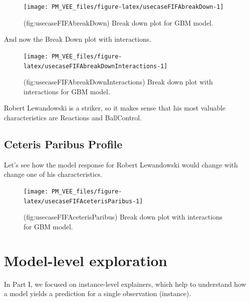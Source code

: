 \documentclass[12pt,]{krantz}
\begin{document}
\begin{figure}

{\centering \texttt{[image: PM\_VEE\_files/figure-latex/usecaseFIFAbreakDown-1]} 

}

\caption{(fig:usecaseFIFAbreakDown) Break down plot for GBM model.}\label{fig:usecaseFIFAbreakDown}
\end{figure}

And now the Break Down plot with interactions.

\begin{figure}

{\centering \texttt{[image: PM\_VEE\_files/figure-latex/usecaseFIFAbreakDownInteractions-1]} 

}

\caption{(fig:usecaseFIFAbreakDownInteractions) Break down plot with interactions for GBM model.}\label{fig:usecaseFIFAbreakDownInteractions}
\end{figure}

Robert Lewandowski is a striker, so it makes sense that his most valuable characteristics are Reactions and BallControl.

\hypertarget{ceteris-paribus-profile}{%
\subsection{Ceteris Paribus Profile}\label{ceteris-paribus-profile}}

Let's see how the model response for Robert Lewandowski would change with change one of his characteristics.

\begin{figure}

{\centering \texttt{[image: PM\_VEE\_files/figure-latex/usecaseFIFAceterisParibus-1]} 

}

\caption{(fig:usecaseFIFAceterisParibus) Break down plot with interactions for GBM model.}\label{fig:usecaseFIFAceterisParibus}
\end{figure}

\hypertarget{modelLevelExploration}{%
\section{Model-level exploration}\label{modelLevelExploration}}

In Part I, we focused on instance-level explainers, which help to understand how a model yields a prediction for a single observation (instance).
\end{document}
